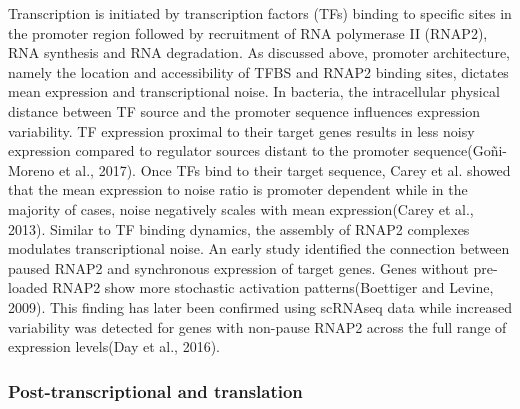 Transcription is initiated by transcription factors (TFs) binding to specific sites in the promoter region followed by recruitment of RNA polymerase II (RNAP2), RNA synthesis and RNA degradation. As discussed above, promoter architecture, namely the location and accessibility of TFBS and RNAP2 binding sites, dictates mean expression and transcriptional noise. 
In bacteria, the intracellular physical distance between TF source and the promoter sequence influences expression variability. TF expression proximal to their target genes results in less noisy expression compared to regulator sources distant to the promoter sequence(Goñi-Moreno et al., 2017). Once TFs bind to their target sequence, Carey et al. showed that the mean expression to noise ratio is promoter dependent while in the majority of cases, noise negatively scales with mean expression(Carey et al., 2013).   
Similar to TF binding dynamics, the assembly of RNAP2 complexes modulates transcriptional noise. An early study identified the connection between paused RNAP2 and synchronous expression of target genes. Genes without pre-loaded RNAP2 show more stochastic activation patterns(Boettiger and Levine, 2009). This finding has later been confirmed using scRNAseq data while increased variability was detected for genes with non-pause RNAP2 across the full range of expression levels(Day et al., 2016). 

\subsubsection{Post-transcriptional and translation}

